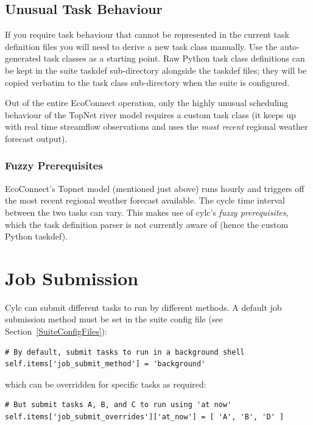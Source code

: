 \documentclass[11pt,a4paper]{article}
\begin{document}
\subsection{Unusual Task Behaviour}
\label{UnusualTaskBehaviour}

If you require task behaviour that cannot be represented in the current 
task definition files you will need to derive a new task class manually.
Use the auto-generated task classes as a starting point. Raw Python 
task class definitions can be kept in the suite taskdef sub-directory
alongside the taskdef files; they will be copied verbatim to the
task class sub-directory when the suite is configured.

Out of the entire EcoConnect operation, only the highly unusual
scheduling behaviour of the TopNet river model requires a custom task
class (it keeps up with real time streamflow observations and uses
the {\em most recent} regional weather forecast output). 

\subsubsection{Fuzzy Prerequisites}

EcoConnect's Topnet model (mentioned just above) runs hourly and
triggers off the most recent regional weather forecast available.
The cycle time interval between the two tasks can vary. This makes 
use of cylc's {\em fuzzy prerequisites}, which the task definition
parser is not currently aware of (hence the custom Python taskdef).

\pagebreak
\section{Job Submission}
\label{JobSubmission}

Cylc can submit different tasks to run by different methods.  A default
job submission method must be set in the suite config file (see
Section~\ref{SuiteConfigFiles}):
 
\lstset{language=Python}

\begin{lstlisting}
# By default, submit tasks to run in a background shell
self.items['job_submit_method'] = 'background'
\end{lstlisting}
 
which can be overridden for specific tasks as required:

\begin{lstlisting}
# But submit tasks A, B, and C to run using 'at now'
self.items['job_submit_overrides']['at_now'] = [ 'A', 'B', 'D' ]
\end{lstlisting}
\end{document}
